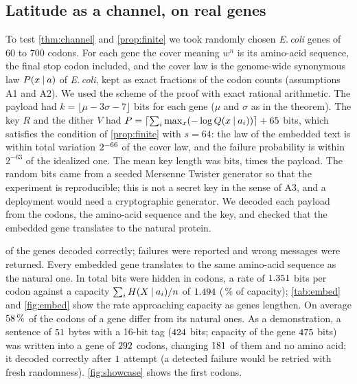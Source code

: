 \subsection{Latitude as a channel, on real genes}\label{sec:embedding}
To test \cref{thm:channel} and \cref{prop:finite} we took \EmbGenes{} randomly chosen \emph{E.\,coli} genes of $60$ to $700$ codons. For each gene the cover meaning $w^n$ is its amino-acid sequence, the final stop codon included, and the cover law is the genome-wide synonymous law $P(x\mathbin{\vert} a)$ of \emph{E.\,coli}, kept as exact fractions of the codon counts (assumptions A1 and A2). We used the scheme of the proof with exact rational arithmetic. The payload had $k=\lfloor\mu-3\sigma-7\rfloor$ bits for each gene ($\mu$ and $\sigma$ as in the theorem). The key $R$ and the dither $V$ had $P=\lceil\sum_i\max_x(-\log Q(x\mathbin{\vert} a_i))\rceil+65$ bits, which satisfies the condition of \cref{prop:finite} with $s=64$: the law of the embedded text is within total variation $2^{-66}$ of the cover law, and the failure probability is within $2^{-63}$ of the idealized one. The mean key length was \EmbKeyBits{} bits, \EmbKeyRatio{} times the payload. The random bits came from a seeded Mersenne Twister generator so that the experiment is reproducible; this is not a secret key in the sense of A3, and a deployment would need a cryptographic generator. We decoded each payload from the codons, the amino-acid sequence and the key, and checked that the embedded gene translates to the natural protein.

\EmbOK{} of the \EmbGenes{} genes decoded correctly; \EmbFail{} failures were reported and \EmbSilent{} wrong messages were returned. Every embedded gene translates to the same amino-acid sequence as the natural one. In total \EmbBits{} bits were hidden in \EmbCodons{} codons, a rate of $1.351$ bits per codon against a capacity $\sum_iH(X\mathbin{\vert} a_i)/n$ of $1.494$ (\EmbEff\,\% of capacity); \cref{tab:embed} and \cref{fig:embed} show the rate approaching capacity as genes lengthen. On average $58\,\%$ of the codons of a gene differ from its natural ones. As a demonstration, a sentence of $51$ bytes with a 16-bit tag ($424$ bits; capacity of the gene $475$ bits) was written into a gene of $292$ codons, changing $181$ of them and no amino acid; it decoded correctly after $1$ attempt (a detected failure would be retried with fresh randomness). \cref{fig:showcase} shows the first codons.

